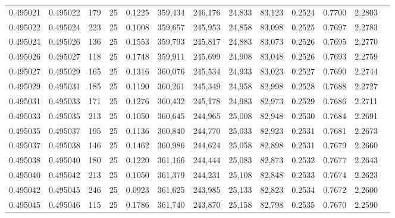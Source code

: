 \begin{tabular}{rrrrrrrrrrrrr}
0.495021 & 0.495022 &   179 &  25 &                                     0.1225 & 359,434 & 246,176 &  24,833 &  83,123 & 0.2524 & 0.7700 & 2.2803 \\
0.495022 & 0.495024 &   223 &  25 &                                     0.1008 & 359,657 & 245,953 &  24,858 &  83,098 & 0.2525 & 0.7697 & 2.2783 \\
0.495024 & 0.495026 &   136 &  25 &                                     0.1553 & 359,793 & 245,817 &  24,883 &  83,073 & 0.2526 & 0.7695 & 2.2770 \\
0.495026 & 0.495027 &   118 &  25 &                                     0.1748 & 359,911 & 245,699 &  24,908 &  83,048 & 0.2526 & 0.7693 & 2.2759 \\
0.495027 & 0.495029 &   165 &  25 &                                     0.1316 & 360,076 & 245,534 &  24,933 &  83,023 & 0.2527 & 0.7690 & 2.2744 \\
0.495029 & 0.495031 &   185 &  25 &                                     0.1190 & 360,261 & 245,349 &  24,958 &  82,998 & 0.2528 & 0.7688 & 2.2727 \\
0.495031 & 0.495033 &   171 &  25 &                                     0.1276 & 360,432 & 245,178 &  24,983 &  82,973 & 0.2529 & 0.7686 & 2.2711 \\
0.495033 & 0.495035 &   213 &  25 &                                     0.1050 & 360,645 & 244,965 &  25,008 &  82,948 & 0.2530 & 0.7684 & 2.2691 \\
0.495035 & 0.495037 &   195 &  25 &                                     0.1136 & 360,840 & 244,770 &  25,033 &  82,923 & 0.2531 & 0.7681 & 2.2673 \\
0.495037 & 0.495038 &   146 &  25 &                                     0.1462 & 360,986 & 244,624 &  25,058 &  82,898 & 0.2531 & 0.7679 & 2.2660 \\
0.495038 & 0.495040 &   180 &  25 &                                     0.1220 & 361,166 & 244,444 &  25,083 &  82,873 & 0.2532 & 0.7677 & 2.2643 \\
0.495040 & 0.495042 &   213 &  25 &                                     0.1050 & 361,379 & 244,231 &  25,108 &  82,848 & 0.2533 & 0.7674 & 2.2623 \\
0.495042 & 0.495045 &   246 &  25 &                                     0.0923 & 361,625 & 243,985 &  25,133 &  82,823 & 0.2534 & 0.7672 & 2.2600 \\
0.495045 & 0.495046 &   115 &  25 &                                     0.1786 & 361,740 & 243,870 &  25,158 &  82,798 & 0.2535 & 0.7670 & 2.2590 \\

\end{tabular}
